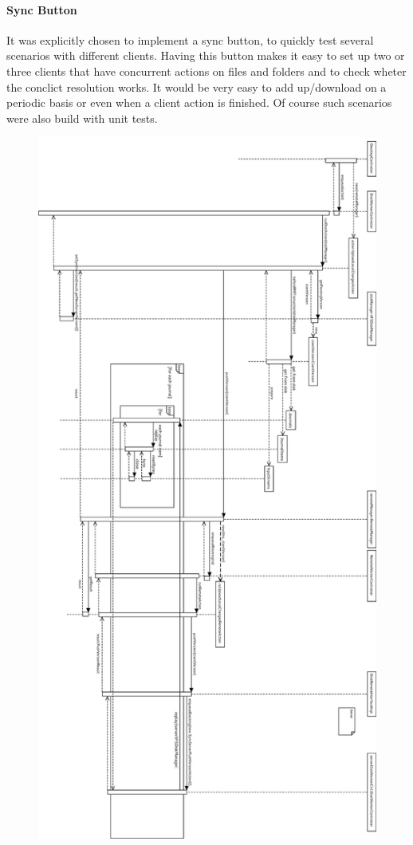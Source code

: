 \paragraph{Sync Button} It was explicitly chosen to implement a sync button, to
quickly test several scenarios with different clients. Having this button makes
it easy to set up two or three clients that have concurrent actions on files
and folders and to check wheter the conclict resolution works. It would be very
easy to add up/download on a periodic basis or even when a client action is
finished. Of course such scenarios were also build with unit tests.

\begin{figure}[h!]
\centering
\includegraphics[height=\textheight,width=\textwidth,keepaspectratio]{figures/22uploadChanges.eps}

\end{figure}

